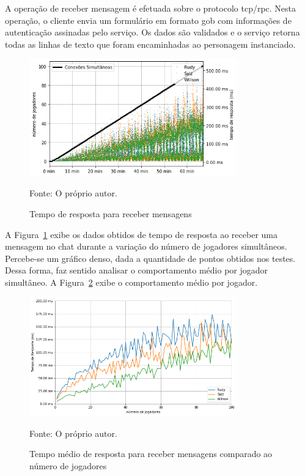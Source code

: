 A operação de receber mensagem é efetuada sobre o protocolo \ac{tcp}/\ac{rpc}.
%
Nesta operação, o cliente envia um formulário em formato \ac{gob} com informações de autenticação assinadas pelo serviço.
%
Os dados são validados e o serviço retorna todas as linhas de texto que foram encaminhadas ao personagem instanciado.

\begin{figure}[htb!]
  \caption{Tempo de resposta para receber mensagens}
  \label{fig:listen_chat_request_time}
  \includegraphics[width=0.8\textwidth]{figuras/analise/rt/listen_chat_request_time}
  \centering

  Fonte: O próprio autor.
\end{figure}

A Figura~\ref{fig:listen_chat_request_time} exibe os dados obtidos de tempo de resposta ao receber uma mensagem no chat durante a variação do número de jogadores simultâneos.
%
Percebe-se um gráfico denso, dada a quantidade de pontos obtidos nos testes.
%
Dessa forma, faz sentido analisar o comportamento médio por jogador simultâneo.
%
A Figura~\ref{fig:listen_chat_request_time_per_concurrency} exibe o comportamento médio por jogador.

\begin{figure}[htb!]
  \caption{Tempo médio de resposta para receber mensagens comparado ao número de jogadores}
  \label{fig:listen_chat_request_time_per_concurrency}
  \includegraphics[width=0.8\textwidth]{figuras/analise/rt/listen_chat_request_time_per_concurrency}
  \centering

  Fonte: O próprio autor.
\end{figure}

